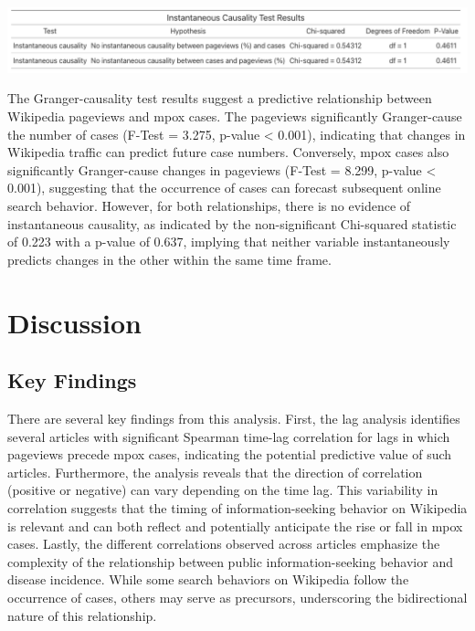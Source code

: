 \documentclass[
  12pt,
]{article}
\begin{document}
\includegraphics{images/Bildschirmfoto 2024-04-29 um 22.51.35.png}

The Granger-causality test results suggest a predictive relationship
between Wikipedia pageviews and mpox cases. The pageviews significantly
Granger-cause the number of cases (F-Test = 3.275, p-value \textless{}
0.001), indicating that changes in Wikipedia traffic can predict future
case numbers. Conversely, mpox cases also significantly Granger-cause
changes in pageviews (F-Test = 8.299, p-value \textless{} 0.001),
suggesting that the occurrence of cases can forecast subsequent online
search behavior. However, for both relationships, there is no evidence
of instantaneous causality, as indicated by the non-significant
Chi-squared statistic of 0.223 with a p-value of 0.637, implying that
neither variable instantaneously predicts changes in the other within
the same time frame.

\section{Discussion}\label{discussion}

\subsection{Key Findings}\label{key-findings}

There are several key findings from this analysis. First, the lag
analysis identifies several articles with significant Spearman time-lag
correlation for lags in which pageviews precede mpox cases, indicating
the potential predictive value of such articles. Furthermore, the
analysis reveals that the direction of correlation (positive or
negative) can vary depending on the time lag. This variability in
correlation suggests that the timing of information-seeking behavior on
Wikipedia is relevant and can both reflect and potentially anticipate
the rise or fall in mpox cases. Lastly, the different correlations
observed across articles emphasize the complexity of the relationship
between public information-seeking behavior and disease incidence. While
some search behaviors on Wikipedia follow the occurrence of cases,
others may serve as precursors, underscoring the bidirectional nature of
this relationship.
\end{document}
